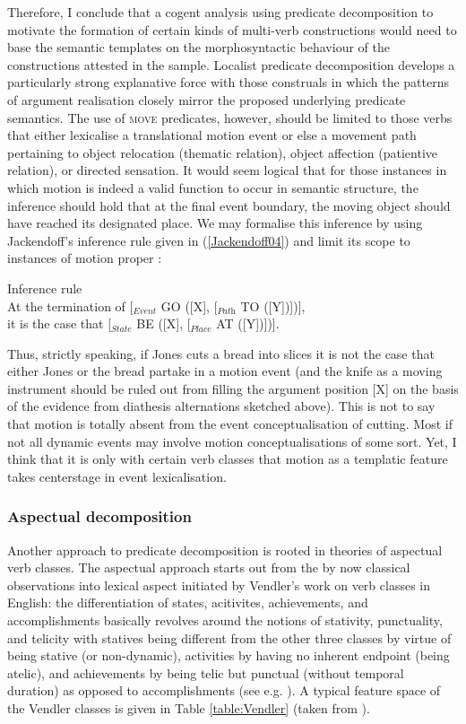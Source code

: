 Therefore, I conclude that a cogent analysis using predicate decomposition to motivate the formation of certain kinds of multi-verb constructions would need to base the semantic templates on the morphosyntactic behaviour of the constructions attested in the sample. Localist predicate decomposition develops a particularly strong explanative force with those construals in which the patterns of argument realisation closely mirror the proposed underlying predicate semantics. The use of \textsc{move} predicates, however, should be limited to those verbs that either lexicalise a translational motion event or else a movement path pertaining to object relocation (thematic relation), object affection (patientive relation), or directed sensation.
It would seem logical that for those instances in which motion is indeed a valid function to occur in semantic structure, the inference should hold that at the final event boundary, the moving object should have reached its designated place. We may formalise this inference by using Jackendoff's inference rule given in (\ref{Jackendoff04}) and limit its scope to instances of motion proper \citep[27]{Jackendoff1990}:

\ea \label{Jackendoff04} Inference rule \\
At the termination of [$_{\textit{Event}}$ GO ([X], [$_{\textit{Path}}$ TO ([Y])])], \\
it is the case that [$_{\textit{State}}$ BE ([X], [$_{\textit{Place}}$ AT ([Y])])].
\z

Thus, strictly speaking, if Jones cuts a bread into slices it is not the case that either Jones or the bread partake in a motion event (and the knife as a moving instrument should be ruled out from filling the argument position [X] on the basis of the evidence from diathesis alternations sketched above). This is not to say that motion is totally absent from the event conceptualisation of cutting. Most if not all dynamic events may involve motion conceptualisations of some sort. Yet, I think that it is only with certain verb classes that motion as a templatic feature takes centerstage in event lexicalisation.

\subsubsection{Aspectual decomposition}

Another approach to predicate decomposition is rooted in theories of aspectual verb classes. The aspectual approach starts out from the by now classical observations into lexical aspect initiated by Vendler's work on verb classes in English: the differentiation of states, acitivites, achievements, and accomplishments basically revolves around the notions of stativity, punctuality, and telicity with statives being different from the other three classes by virtue of being stative (or non-dynamic), activities by having no inherent endpoint (being atelic), and achievements by being telic but punctual (without temporal duration) as opposed to accomplishments (see e.g. \citealt{levin2005argument, croft2012verbs}). A typical feature space of the Vendler classes is given in Table \ref{table:Vendler} (taken from \citealt[93]{van1997syntax}).

